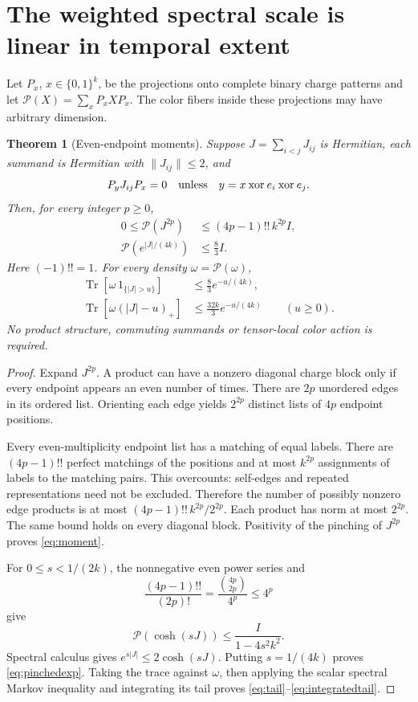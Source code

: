 \documentclass[11pt]{article}
\newtheorem{theorem}{Theorem}[section]
\newcommand{\Tr}{\operatorname{Tr}}
\newcommand{\norm}[1]{\lVert #1\rVert}
\begin{document}
\section{The weighted spectral scale is linear in temporal extent}

Let \(P_x\), \(x\in\{0,1\}^k\), be the projections onto complete
binary charge patterns and let \(\mathcal P(X)=\sum_xP_xXP_x\).
The color fibers inside these projections may have arbitrary dimension.

\begin{theorem}[Even-endpoint moments]\label{thm:moments}
Suppose \(J=\sum_{i<j}J_{ij}\) is Hermitian, each summand is Hermitian
with \(\norm{J_{ij}}\le2\), and
\[
 P_yJ_{ij}P_x=0
 \quad\hbox{unless}\quad y=x\mathbin{\mathrm{xor}}e_i
                                    \mathbin{\mathrm{xor}}e_j.
\]
Then, for every integer \(p\ge0\),
\begin{align}
 0\le\mathcal P(J^{2p})&\le(4p-1)!!\,k^{2p}I,\label{eq:moment}\\
 \mathcal P\!\left(e^{|J|/(4k)}\right)&\le\frac83I.\label{eq:pinchedexp}
\end{align}
Here \((-1)!!=1\). For every density \(\omega=\mathcal P(\omega)\),
\begin{align}
 \Tr[\omega\,1_{\{|J|>u\}}]&\le\frac83e^{-u/(4k)},\label{eq:tail}\\
 \Tr[\omega(|J|-u)_+]&\le\frac{32k}{3}e^{-u/(4k)}
 \qquad (u\ge0).\label{eq:integratedtail}
\end{align}
No product structure, commuting summands or tensor-local color action is required.
\end{theorem}
\begin{proof}
Expand \(J^{2p}\). A product can have a nonzero diagonal charge block
only if every endpoint appears an even number of times. There are \(2p\)
unordered edges in its ordered list. Orienting each edge yields \(2^{2p}\)
distinct lists of \(4p\) endpoint positions.

Every even-multiplicity endpoint list has a matching of equal labels.
There are \((4p-1)!!\) perfect matchings of the positions and at most
\(k^{2p}\) assignments of labels to the matching pairs. This overcounts:
self-edges and repeated representations need not be excluded. Therefore
the number of possibly nonzero edge products is at most
\((4p-1)!!\,k^{2p}/2^{2p}\).
Each product has norm at most \(2^{2p}\).
The same bound holds on every diagonal block. Positivity of the pinching
of \(J^{2p}\) proves \eqref{eq:moment}.

For \(0\le s<1/(2k)\), the nonnegative even power series and
\[
 \frac{(4p-1)!!}{(2p)!}
 =\frac{\binom{4p}{2p}}{4^p}\le4^p
\]
give
\[
 \mathcal P(\cosh(sJ))\le\frac{I}{1-4s^2k^2}.
\]
Spectral calculus gives \(e^{s|J|}\le2\cosh(sJ)\).
Putting \(s=1/(4k)\) proves \eqref{eq:pinchedexp}.
Taking the trace against \(\omega\), then applying the scalar spectral
Markov inequality and integrating its tail proves
\eqref{eq:tail}--\eqref{eq:integratedtail}.
\end{proof}
\end{document}
